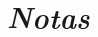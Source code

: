 
\pagestyle{empty}

\chapter*{\LARGE \emph{Notas}}

\thispagestyle{empty}

\begin{Spacing}{1.5}
  

\end{Spacing}









